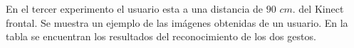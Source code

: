 En el tercer experimento el usuario esta a una distancia de $90$ $cm.$ del Kinect frontal. Se muestra un ejemplo de las imágenes obtenidas de un usuario. En la tabla se encuentran los resultados del reconocimiento de los dos gestos.    

\begin{figure}[h!]
\centering
{}

\end{figure}
